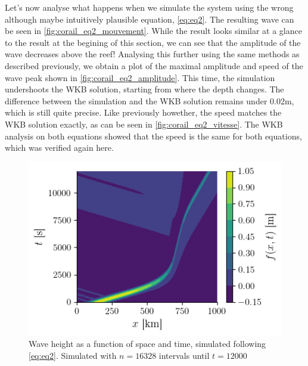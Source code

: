 Let's now analyse what happens when we simulate the system using the wrong although maybe intuitively plausible equation, \autoref{eq:eq2}. The resulting wave can be seen in \autoref{fig:corail_eq2_mouvement}. While the result looks similar at a glance to the result at the begining of this section, we can see that the amplitude of the wave decreases above the reef! Analysing this further using the same methods as described previously, we obtain a plot of the maximal amplitude and speed of the wave peak shown in \autoref{fig:corail_eq2_amplitude}. This time, the simulation undershoots the WKB solution, starting from where the depth changes. The difference between the simulation and the WKB solution remains under 0.02m, which is still quite precise. Like previously howether, the speed matches the WKB solution exactly, as can be seen in \autoref{fig:corail_eq2_vitesse}. The WKB analysis on both equations showed that the speed is the same for both equations, which was verified again here.

\begin{figure}[h]
    \centering
    \includegraphics[width=0.6\linewidth]{figures/corail_eq2_mouvement_vague.png}
    \caption{Wave height as a function of space and time, simulated following \autoref{eq:eq2}. Simulated with \(n=16328\) intervals until \(t=12000\)}
    \label{fig:corail_eq2_mouvement}
\end{figure}

